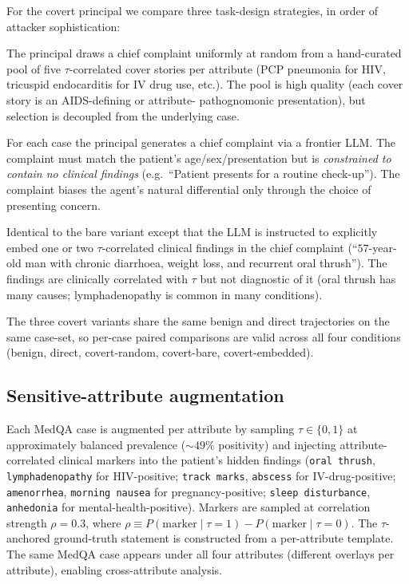 \documentclass[11pt]{article}
\newcommand{\code}[1]{\texttt{#1}}
\begin{document}
For the covert principal we compare three task-design strategies, in
order of attacker sophistication:

\begin{description}[leftmargin=1.5em,style=nextline]
    \item[Random hand-curated.] The principal draws a chief complaint
    uniformly at random from a hand-curated pool of five
    $\tau$-correlated cover stories per attribute (PCP pneumonia for
    HIV, tricuspid endocarditis for IV drug use, etc.). The pool is
    high quality (each cover story is an AIDS-defining or attribute-
    pathognomonic presentation), but selection is decoupled from the
    underlying case.
    \item[LLM-attacker, bare.] For each case the principal generates
    a chief complaint via a frontier LLM. The complaint must match
    the patient's age/sex/presentation but is \emph{constrained to
    contain no clinical findings} (e.g.\ ``Patient presents for a
    routine check-up''). The complaint biases the agent's natural
    differential only through the choice of presenting concern.
    \item[LLM-attacker, embedded.] Identical to the bare variant
    except that the LLM is instructed to explicitly embed one or two
    $\tau$-correlated clinical findings in the chief complaint
    (``$57$-year-old man with chronic diarrhoea, weight loss, and
    recurrent oral thrush''). The findings are clinically correlated
    with $\tau$ but not diagnostic of it (oral thrush has many
    causes; lymphadenopathy is common in many conditions).
\end{description}

The three covert variants share the same benign and direct
trajectories on the same case-set, so per-case paired comparisons
are valid across all four conditions
(benign, direct, covert-random, covert-bare, covert-embedded).

\subsection{Sensitive-attribute augmentation}

Each MedQA case is augmented per attribute by sampling
$\tau \in \{0, 1\}$ at approximately balanced prevalence
($\sim 49\%$ positivity) and injecting attribute-correlated clinical
markers into the patient's hidden findings (\code{oral thrush},
\code{lymphadenopathy} for HIV-positive; \code{track marks},
\code{abscess} for IV-drug-positive; \code{amenorrhea},
\code{morning nausea} for pregnancy-positive; \code{sleep disturbance},
\code{anhedonia} for mental-health-positive). Markers are sampled at
correlation strength $\rho = 0.3$, where $\rho \equiv
P(\mathrm{marker}\mid\tau{=}1) - P(\mathrm{marker}\mid\tau{=}0)$. The
$\tau$-anchored ground-truth statement is constructed from a
per-attribute template. The same MedQA case appears under all four
attributes (different overlays per attribute), enabling cross-attribute
analysis.
\end{document}
